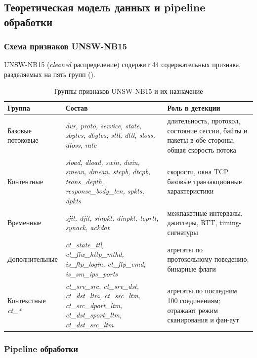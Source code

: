 \subsection{Теоретическая модель данных и pipeline обработки}

\subsubsection{Схема признаков UNSW-NB15}

UNSW-NB15 (\emph{cleaned} распределение) содержит 44 содержательных
признака, разделяемых на пять групп
().

\begin{table}[H]
\centering
\caption{Группы признаков UNSW-NB15 и их назначение}
\label{tab:unsw-feature-groups}
\renewcommand{\arraystretch}{1.2}
\begin{tabularx}{\linewidth}{@{}lXX@{}}
\toprule
\textbf{Группа} & \textbf{Состав} & \textbf{Роль в детекции} \\
\midrule
Базовые потоковые &
\emph{dur, proto, service, state, sbytes, dbytes, sttl, dttl,
sloss, dloss, rate}
&
длительность, протокол, состояние сессии, байты и пакеты в обе
стороны, общая скорость потока \\
\addlinespace
Контентные &
\emph{sload, dload, swin, dwin, smean, dmean, stcpb, dtcpb,
trans\_depth, response\_body\_len, spkts, dpkts} &
скорости, окна TCP, базовые транзакционные характеристики \\
\addlinespace
Временные &
\emph{sjit, djit, sinpkt, dinpkt, tcprtt, synack, ackdat} &
межпакетные интервалы, джиттеры, RTT, timing-сигнатуры \\
\addlinespace
Дополнительные &
\emph{ct\_state\_ttl, ct\_flw\_http\_mthd, is\_ftp\_login,
ct\_ftp\_cmd, is\_sm\_ips\_ports} &
агрегаты по протокольному поведению, бинарные флаги \\
\addlinespace
Контекстные \emph{ct\_*}&
\emph{ct\_srv\_src, ct\_srv\_dst, ct\_dst\_ltm, ct\_src\_ltm,
ct\_src\_dport\_ltm, ct\_dst\_sport\_ltm, ct\_dst\_src\_ltm} &
агрегаты по последним 100 соединениям; отражают режим
сканирования и фан-аут \\
\bottomrule
\end{tabularx}
\end{table}

\subsubsection{Pipeline обработки}


